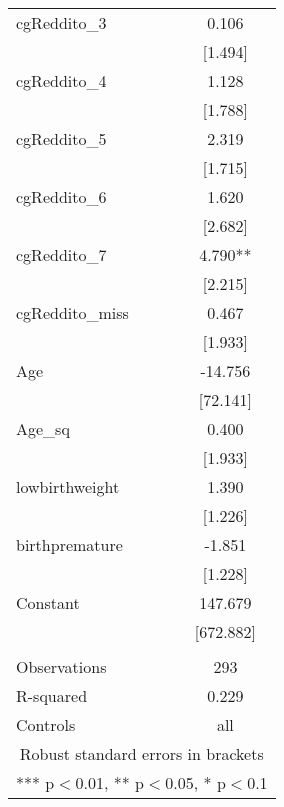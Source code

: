 \documentclass[]{article}
\begin{document}
\begin{tabular}{lc}
cgReddito\_3 & 0.106 \\
 & [1.494] \\
cgReddito\_4 & 1.128 \\
 & [1.788] \\
cgReddito\_5 & 2.319 \\
 & [1.715] \\
cgReddito\_6 & 1.620 \\
 & [2.682] \\
cgReddito\_7 & 4.790** \\
 & [2.215] \\
cgReddito\_miss & 0.467 \\
 & [1.933] \\
Age & -14.756 \\
 & [72.141] \\
Age\_sq & 0.400 \\
 & [1.933] \\
lowbirthweight & 1.390 \\
 & [1.226] \\
birthpremature & -1.851 \\
 & [1.228] \\
Constant & 147.679 \\
 & [672.882] \\
 &  \\
Observations & 293 \\
R-squared & 0.229 \\
 Controls & all \\ \hline
\multicolumn{2}{c}{ Robust standard errors in brackets} \\
\multicolumn{2}{c}{ *** p$<$0.01, ** p$<$0.05, * p$<$0.1} \\
\end{tabular}
\end{document}
